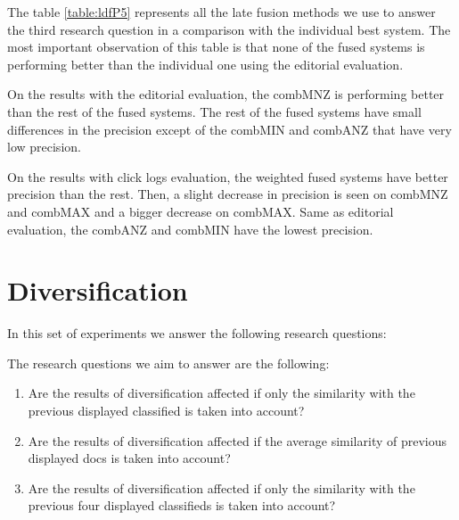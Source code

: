 The table \ref{table:ldfP5} represents all the late fusion methods we use to answer the third research question in a comparison with the individual best system. The most important observation of this table is that none of the fused systems is performing better than the individual one using the editorial evaluation.

On the results with the editorial evaluation, the combMNZ is performing better than the rest of the fused systems. The rest of the fused systems have small differences in the precision except of the combMIN and combANZ that have very low precision.

On the results with click logs evaluation, the weighted fused systems have better precision than the rest. Then, a slight decrease in precision is seen on combMNZ and combMAX and a bigger decrease on combMAX. Same as editorial evaluation, the combANZ and combMIN have the lowest precision.


\section{Diversification}

In this set of experiments we answer the following research questions:

The research questions we aim to answer are the following:
\begin{enumerate}
\item Are the results of diversification affected if only the similarity with the previous displayed classified is taken into account?
\item Are the results of diversification affected if the average similarity of previous displayed docs is taken into account?
\item Are the results of diversification affected if only the similarity with the previous four displayed classifieds is taken into account?
\end{enumerate}

